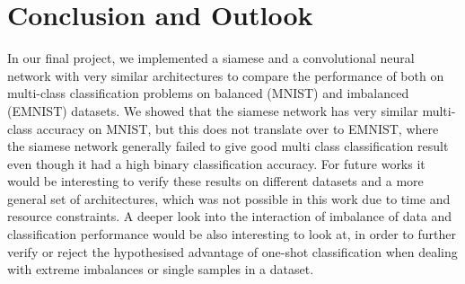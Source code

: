 ﻿\documentclass[a4paper,pt12]{article}
\begin{document}
\section{Conclusion and Outlook}
In our final project, we implemented a siamese and a convolutional neural network with very similar architectures to compare the performance of both on multi-class classification problems on balanced (MNIST) and imbalanced (EMNIST) datasets. \newline
We showed that the siamese network has very similar multi-class accuracy on MNIST, but this does not translate over to EMNIST, where the siamese network generally failed to give good multi class classification result even though it had a high binary classification accuracy. \newline
For future works it would be interesting to verify these results on different datasets and a more general set of architectures, which was not possible in this work due to time and resource constraints. A deeper look into the interaction of imbalance of data and classification performance would be also interesting to look at, in order to further verify or reject the hypothesised advantage of one-shot classification when dealing with extreme imbalances or single samples in a dataset.
\end{document}
